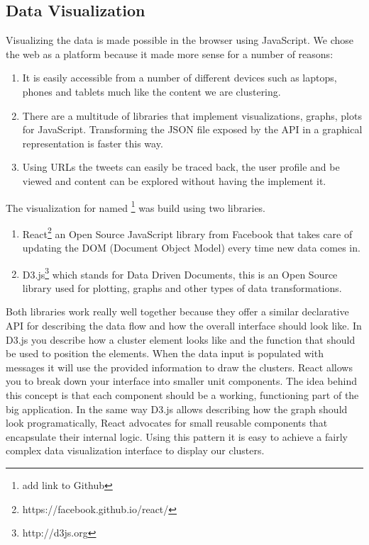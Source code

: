 \subsection{Data Visualization}
\label{datavisualization}

Visualizing the data is made possible in the browser using JavaScript. We chose the web as a platform because it made more sense for a number of reasons:
\begin{enumerate}
	\item It is easily accessible from a number of different devices such as laptops, phones and tablets much like the content we are clustering.
	\item There are a multitude of libraries that implement visualizations, graphs, plots for JavaScript. Transforming the JSON file exposed by the API in a graphical representation is faster this way.
	\item Using URLs the tweets can easily be traced back, the user profile and be viewed and content can be explored without having the implement it.
\end{enumerate}
The visualization for {\project} named \textbf{\frontend}\footnote{add link to Github} was build using two libraries.
\begin{enumerate}
	\item React\footnote{https://facebook.github.io/react/} an Open Source JavaScript library from Facebook that takes care of updating the DOM (Document Object Model) every time new data comes in.
	\item D3.js\footnote{http://d3js.org} which stands for Data Driven Documents, this is an Open Source library used for plotting, graphs and other types of data transformations.
\end{enumerate}
Both libraries work really well together because they offer a similar declarative API for describing the data flow and how the overall interface should look like. In D3.js you describe how a cluster element looks like and the function that should be used to position the elements. When the data input is populated with messages it will use the provided information to draw the clusters.
\newline
React allows you to break down your interface into smaller unit components. The idea behind this concept is that each component should be a working, functioning part of the big application. In the same way D3.js allows describing how the graph should look programatically, React advocates for small reusable components that encapsulate their internal logic. Using this pattern it is easy to achieve a fairly complex data visualization interface to display our clusters.

